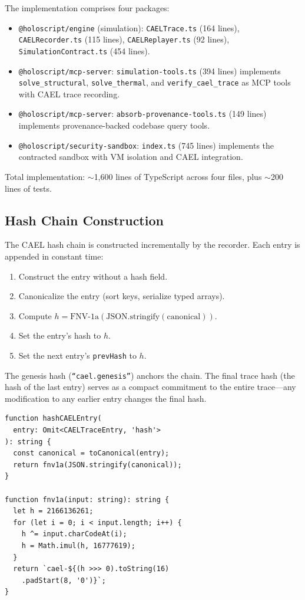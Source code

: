 \documentclass[letterpaper,twocolumn,10pt]{article}
\begin{document}
The implementation comprises four packages:

\begin{itemize}[nosep,leftmargin=*]
\item \texttt{@holoscript/engine} (simulation): \texttt{CAELTrace.ts} (164
  lines), \texttt{CAELRecorder.ts} (115 lines), \texttt{CAELReplayer.ts} (92
  lines), \texttt{SimulationContract.ts} (454 lines).
\item \texttt{@holoscript/mcp-server}: \texttt{simulation-tools.ts} (394
  lines) implements \texttt{solve\_structural}, \texttt{solve\_thermal}, and
  \texttt{verify\_cael\_trace} as MCP tools with CAEL trace recording.
\item \texttt{@holoscript/mcp-server}: \texttt{absorb-provenance-tools.ts}
  (149 lines) implements provenance-backed codebase query tools.
\item \texttt{@holoscript/security-sandbox}: \texttt{index.ts} (745 lines)
  implements the contracted sandbox with VM isolation and CAEL integration.
\end{itemize}

\noindent Total implementation: $\sim$1,600 lines of TypeScript across four
files, plus $\sim$200 lines of tests.

\subsection{Hash Chain Construction}

The CAEL hash chain is constructed incrementally by the recorder. Each
entry is appended in constant time:

\begin{enumerate}[nosep,leftmargin=*]
\item Construct the entry without a hash field.
\item Canonicalize the entry (sort keys, serialize typed arrays).
\item Compute $h = \text{FNV-1a}(\text{JSON.stringify}(\text{canonical}))$.
\item Set the entry's hash to $h$.
\item Set the next entry's \texttt{prevHash} to $h$.
\end{enumerate}

The genesis hash (\texttt{``cael.genesis''}) anchors the chain. The final
trace hash (the hash of the last entry) serves as a compact commitment to the
entire trace---any modification to any earlier entry changes the final hash.

\begin{lstlisting}[caption={Hash chain entry construction.},
  label=lst:hashentry]
function hashCAELEntry(
  entry: Omit<CAELTraceEntry, 'hash'>
): string {
  const canonical = toCanonical(entry);
  return fnv1a(JSON.stringify(canonical));
}

function fnv1a(input: string): string {
  let h = 2166136261;
  for (let i = 0; i < input.length; i++) {
    h ^= input.charCodeAt(i);
    h = Math.imul(h, 16777619);
  }
  return `cael-${(h >>> 0).toString(16)
    .padStart(8, '0')}`;
}
\end{lstlisting}
\end{document}
